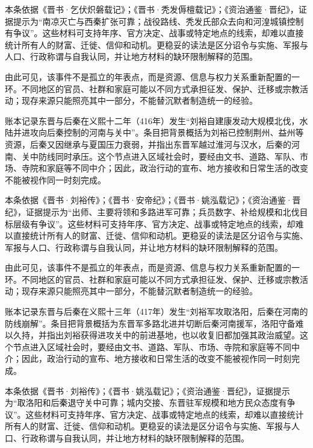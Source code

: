 本条依据《晋书·乞伏炽磐载记》；《晋书·秃发傉檀载记》；《资治通鉴·晋纪》，证据提示为“南凉灭亡与西秦扩张可靠；战役路线、秃发氏部众去向和河湟城镇控制有争议”。这些材料可支持年序、官方决定、战事或特定地点的线索，却难以直接统计所有人的财富、迁徙、信仰和动机。更稳妥的读法是区分诏令与实施、军报与人口、行政称谓与自我认同，并让地方材料的缺环限制解释的范围。

由此可见，该事件不是孤立的年表点，而是资源、信息与权力关系重新配置的一环。不同地区的官员、社群和家庭可能以不同方式承担征发、保护、迁移或宗教活动；现存来源只能照亮其中一部分，不能替沉默者制造统一的经验。

账本记录东晋与后秦在义熙十二年（416年）发生“刘裕自建康发动大规模北伐，水陆并进攻向后秦控制的河南与关中”。条目把背景概括为刘裕已控制荆州、益州等资源，后秦又因继承与夏国压力衰弱，并指出东晋军越过淮河与汉水，后秦的河南、关中防线同时承压。这个节点进入区域社会时，要经由文书、道路、军队、市场、寺院和家庭等不同中介；因此，政治行动的宣布、地方接收和日常生活的改变不能被视作同一时刻完成。

本条依据《晋书·刘裕传》；《晋书·安帝纪》；《晋书·姚泓载记》；《资治通鉴·晋纪》，证据提示为“出师、主要将领和多路进军可靠；兵员数字、补给规模和北伐目标层级有争议”。这些材料可支持年序、官方决定、战事或特定地点的线索，却难以直接统计所有人的财富、迁徙、信仰和动机。更稳妥的读法是区分诏令与实施、军报与人口、行政称谓与自我认同，并让地方材料的缺环限制解释的范围。

由此可见，该事件不是孤立的年表点，而是资源、信息与权力关系重新配置的一环。不同地区的官员、社群和家庭可能以不同方式承担征发、保护、迁移或宗教活动；现存来源只能照亮其中一部分，不能替沉默者制造统一的经验。

账本记录东晋与后秦在义熙十三年（417年）发生“刘裕军攻取洛阳，后秦在河南的防线崩解”。条目把背景概括为东晋军多路北进并切断后秦河南援军，洛阳守备难以久持，并指出刘裕获得进攻关中的前进基地，也以收复旧都加强其政治威望。这个节点进入区域社会时，要经由文书、道路、军队、市场、寺院和家庭等不同中介；因此，政治行动的宣布、地方接收和日常生活的改变不能被视作同一时刻完成。

本条依据《晋书·刘裕传》；《晋书·姚泓载记》；《资治通鉴·晋纪》，证据提示为“取洛阳和后秦退守关中可靠；城内交接、东晋驻军规模和地方民众态度有争议”。这些材料可支持年序、官方决定、战事或特定地点的线索，却难以直接统计所有人的财富、迁徙、信仰和动机。更稳妥的读法是区分诏令与实施、军报与人口、行政称谓与自我认同，并让地方材料的缺环限制解释的范围。

